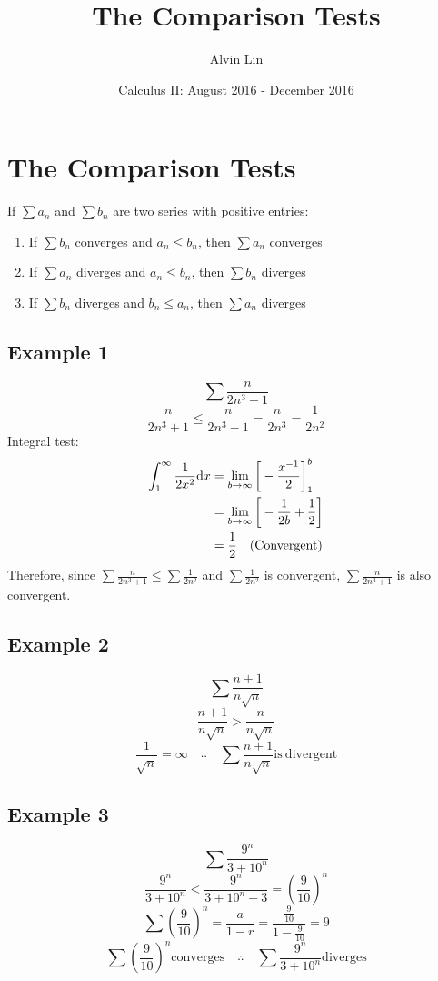 \documentclass[letterpaper, 12pt]{math}
\title{The Comparison Tests}
\author{Alvin Lin}
\date{Calculus II: August 2016 - December 2016}
\begin{document}
\maketitle

\section*{The Comparison Tests}
If \( \sum{a_{n}} \) and \( \sum{b_{n}} \) are two series with positive entries:
\begin{enumerate}
  \item If \( \sum{b_{n}} \) converges and \( a_{n} \leq b_{n} \), then
    \( \sum{a_{n}} \) converges
  \item If \( \sum{a_{n}} \) diverges and \( a_{n} \leq b_{n} \), then
    \( \sum{b_{n}} \) diverges
  \item If \( \sum{b_{n}} \) diverges and \( b_{n} \leq a_{n} \), then
    \( \sum{a_{n}} \) diverges
\end{enumerate}

\subsection*{Example 1}
\[ \sum\frac{n}{2n^{3}+1} \]
\[ \frac{n}{2n^{3}+1} \leq \frac{n}{2n^{3}-1} = \frac{n}{2n^{3}} =
   \frac{1}{2n^{2}} \]
Integral test:
\begin{align*}
  \int_{1}^{\infty}\frac{1}{2x^{2}}\mathrm{d}{x} &=
    \lim_{b\to\infty}\bigg[-\frac{x^{-1}}{2}\bigg]_{1}^{b} \\
  &= \lim_{b\to\infty}\bigg[-\frac{1}{2b}+\frac{1}{2}\bigg] \\
  &= \frac{1}{2} \quad \mathrm{(Convergent)}
\end{align*}
Therefore, since \( \sum\frac{n}{2n^{3}+1} \leq \sum\frac{1}{2n^{2}} \) and
\( \sum\frac{1}{2n^{2}} \) is convergent, \( \sum\frac{n}{2n^{3}+1} \) is
also convergent.

\subsection*{Example 2}
\[ \sum\frac{n+1}{n\sqrt{n}} \]
\[ \frac{n+1}{n\sqrt{n}} > \frac{n}{n\sqrt{n}} \]
\[ \frac{1}{\sqrt{n}} = \infty \quad \therefore \quad \sum\frac{n+1}{n\sqrt{n}}
   \mathrm{is\ divergent} \]

\subsection*{Example 3}
\[ \sum\frac{9^{n}}{3+10^{n}} \]
\[ \frac{9^{n}}{3+10^{n}} < \frac{9^{n}}{3+10^{n}-3} = (\frac{9}{10})^{n} \]
\[ \sum(\frac{9}{10})^{n} = \frac{a}{1-r} =
   \frac{\frac{9}{10}}{1-\frac{9}{10}} = 9 \]
\[ \sum(\frac{9}{10})^{n} \mathrm{converges} \quad \therefore \quad
   \sum\frac{9^{n}}{3+10^{n}} \mathrm{diverges} \]
\end{document}

